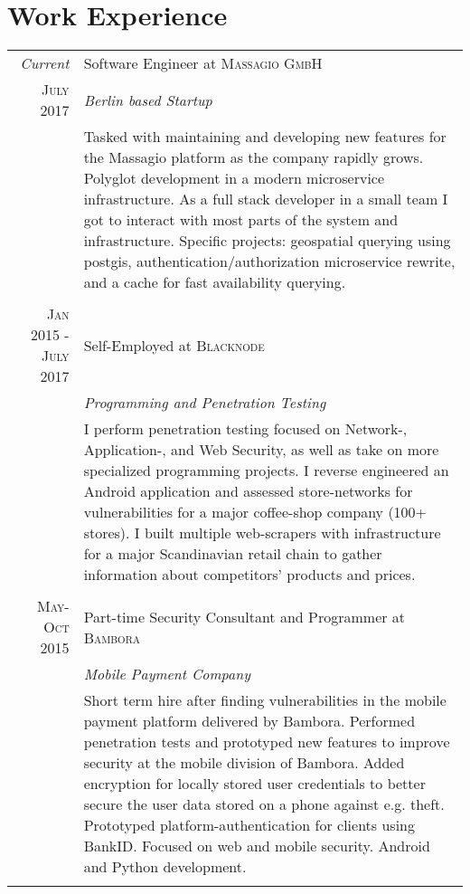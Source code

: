 \documentclass[a4paper,10pt]{article}
\begin{document}
\section{Work Experience}
\begin{tabular}{r|p{11cm}}
 \emph{Current} & Software Engineer at \textsc{Massagio GmbH} \\
 \textsc{July 2017}&\emph{Berlin based Startup}\\
 &\footnotesize{Tasked with maintaining and developing new features for the Massagio platform as the company rapidly grows. 
 Polyglot development in a modern microservice infrastructure. 
 As a full stack developer in a small team I got to interact with most parts of the system and infrastructure. 
 Specific projects: geospatial querying using postgis, authentication/authorization microservice rewrite, 
 and a cache for fast availability querying.}\\ \multicolumn{2}{c}{} \\

 \textsc{Jan 2015 - July 2017} & Self-Employed at \textsc{Blacknode} \\
 &\emph{Programming and Penetration Testing}\\
 &\footnotesize{I perform penetration testing focused on Network-, Application-, and Web Security, as well as take on more specialized programming projects. I reverse engineered an Android application and assessed store-networks for vulnerabilities for a major coffee-shop company (100+ stores). I built multiple web-scrapers with infrastructure for a major Scandinavian retail chain to gather information about competitors' products and prices.}\\\multicolumn{2}{c}{} \\
 
 \textsc{May-Oct 2015} & Part-time Security Consultant and Programmer at \textsc{Bambora}\\
 &\emph{Mobile Payment Company}\\&\footnotesize{Short term hire after finding vulnerabilities in the mobile payment platform delivered by Bambora. Performed penetration tests and prototyped new features to improve security at the mobile division of Bambora. Added encryption for locally stored user credentials to better secure the user data stored on a phone against e.g. theft. Prototyped platform-authentication for clients using BankID. Focused on web and mobile security. Android and Python development.}\\\multicolumn{2}{c}{} \\
 

\end{tabular}
\end{document}

